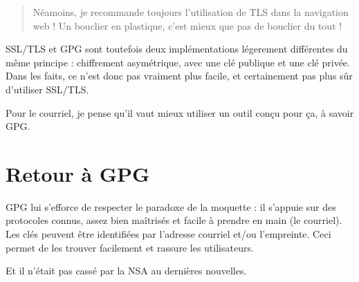 \begin{quote}
	Néamoins, je recommande toujours l'utilisation de TLS dans la navigation web ! Un bouclier en plastique, c'est mieux que pas de bouclier du tout !
\end{quote}

SSL/TLS et GPG sont toutefois deux implémentations légerement différentes du même principe : chiffrement asymétrique, avec une clé
publique et une clé privée. Dans les faits, ce n'est donc pas vraiment plus facile, et certainement pas plus sûr d'utiliser SSL/TLS.

Pour le courriel, je pense qu'il vaut mieux utiliser un outil conçu pour ça, à savoir GPG.

\section{Retour à GPG}\label{retour-uxe0-gpg}

GPG lui s'efforce de respecter le paradoxe de la moquette : il s'appuie sur des protocoles connus, assez bien maîtrisés et facile à prendre en
main (le courriel).\\Les clés peuvent être identifiées par l'adresse
courriel et/ou l'empreinte. Ceci permet de les trouver facilement et rassure les utilisateurs.

Et il n'était pas cassé par la NSA au dernières nouvelles.
